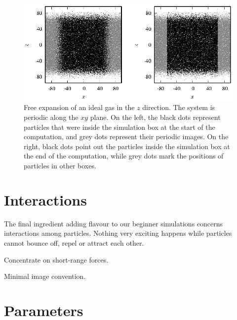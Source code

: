 \begin{figure}
  \includegraphics[width = \textwidth]{figures/free_expansion.eps}
  \caption{\label{free_expansion}Free expansion of an ideal gas in the $z$
           direction. The system is periodic along the $xy$ plane. On the left,
           the black dots represent particles that were inside the simulation
           box at the start of the computation, and grey dots represent their
           periodic images. On the right, black dots point out the particles
           inside the simulation box at the end of the computation, while grey
           dots mark the positions of particles in other boxes.}
\end{figure}

\section{Interactions}

The final ingredient adding flavour to our beginner simulations concerns 
interactions among particles. Nothing very exciting happens while particles
cannot bounce off, repel or attract each other.

Concentrate on short-range forces.

Minimal image convention.

\section{Parameters}
